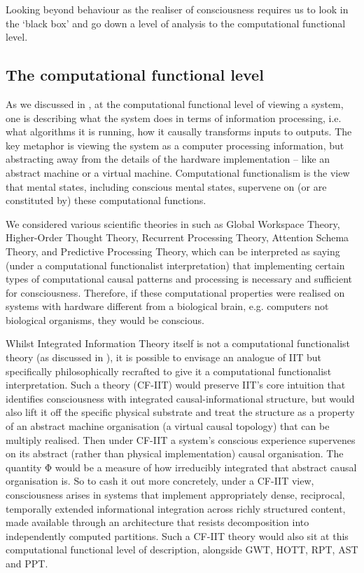 \documentclass[11pt, a4paper, onecolumn, gdm]{google}
\begin{document}
Looking beyond behaviour as the realiser of consciousness requires us to look in the `black box' and go down a level of analysis to the computational functional level.

\subsection{The computational functional level}\label{the-computational-functional-level}

As we discussed in , at the computational functional level of viewing a system, one is describing what the system does in terms of information processing, i.e. what algorithms it is running, how it causally transforms inputs to outputs.
The key metaphor is viewing the system as a computer processing information, but abstracting away from the details of the hardware implementation -- like an abstract machine or a virtual machine.
Computational functionalism is the view that mental states, including conscious mental states, supervene on (or are constituted by) these computational functions.

We considered various scientific theories in  such as Global Workspace Theory, Higher-Order Thought Theory, Recurrent Processing Theory, Attention Schema Theory, and Predictive Processing Theory, which can be interpreted as saying (under a computational functionalist interpretation) that implementing certain types of computational causal patterns and processing is necessary and sufficient for consciousness.
Therefore, if these computational properties were realised on systems with hardware different from a biological brain, e.g. computers not biological organisms, they would be conscious.

Whilst Integrated Information Theory itself is not a computational functionalist theory (as discussed in ), it is possible to envisage an analogue of IIT but specifically philosophically recrafted to give it a computational functionalist interpretation.
Such a theory (CF-IIT) would preserve IIT's core intuition that identifies consciousness with integrated causal-informational structure, but would also lift it off the specific physical substrate and treat the structure as a property of an abstract machine organisation (a virtual causal topology) that can be multiply realised.
Then under CF-IIT a system's conscious experience supervenes on its abstract (rather than physical implementation) causal organisation.
The quantity Φ would be a measure of how irreducibly integrated that abstract causal organisation is.
So to cash it out more concretely, under a CF-IIT view, consciousness arises in systems that implement appropriately dense, reciprocal, temporally extended informational integration across richly structured content, made available through an architecture that resists decomposition into independently computed partitions.
Such a CF-IIT theory would also sit at this computational functional level of description, alongside GWT, HOTT, RPT, AST and PPT.
\end{document}
